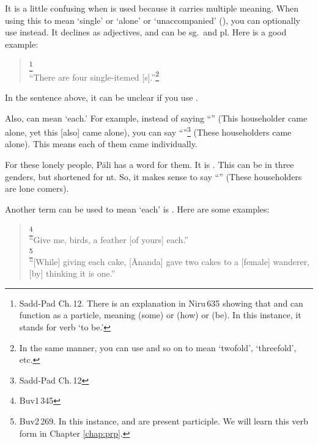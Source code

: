 It is a little confusing when  is used because it carries multiple meaning. When using this to mean `single' or `alone' or `unaccompanied' (), you can optionally use  instead. It declines as adjectives, and can be sg.\ and pl. Here is a good example:

\begin{quote}
\footnote{Sadd-Pad Ch.\,12. There is an explanation in Niru\,635 showing that  and  can function as a particle, meaning  (some) or  (how) or  (be). In this instance, it stands for verb `to be.'}\\
``There are four single-itemed [s].''\footnote{In the same manner, you can use  and so on to mean `twofold', `threefold', etc.}\\
\end{quote}

In the sentence above, it can be unclear if you use . 

Also,  can mean `each.' For example, instead of saying ``'' (This householder came alone, yet this [also] came alone), you can say ``''\footnote{Sadd-Pad Ch.\,12} (These householders came alone). This means each of them came individually. 

For these lonely people, P\=ali has a word for them. It is . This can be in three genders, but shortened  for nt. So, it makes sense to say ``'' (These householders are lone comers).

Another term can be used to mean `each' is .\label{par:ekeka} Here are some examples:

\begin{quote}
\footnote{Buv1\,345}\\
``Give me, birds, a feather [of yours] each.''\\[1.5mm]
\footnote{Buv2\,269. In this instance,  and  are present participle. We will learn this verb form in Chapter \ref{chap:prp}.}\\
``[While] giving each cake, [\=Ananda] gave two cakes to a [female] wanderer, [by] thinking it is one.''\\
\end{quote}


